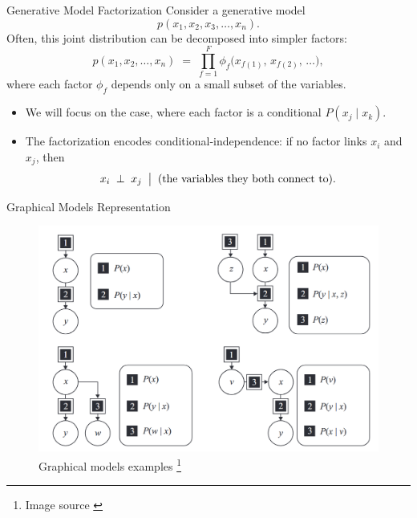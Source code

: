 \documentclass[aspectratio=1610, english]{beamer}
\begin{document}
\begin{frame}{Generative Model Factorization}
  Consider a generative model 
  \[
    p(x_1, x_2, x_3, \dots, x_n).
  \]
  Often, this joint distribution can be decomposed into simpler factors:
  \[
    p(x_1, x_2, \dots, x_n)
      \;=\;\prod_{f=1}^F \phi_f\bigl(x_{f(1)},\,x_{f(2)},\,\dots\bigr),
  \]
  where each factor \(\phi_f\) depends only on a small subset of the variables.  

  \medskip
  
  \begin{itemize}
    \item We will focus on the case, where each factor is a conditional \(P(x_j\!\mid x_k)\).  
    \item  The factorization encodes conditional‐independence: if no factor links \(x_i\) and \(x_j\), then 
      \[
        x_i \;\perp\; x_j 
        \;\bigm|\;
        \text{(the variables they both connect to)}.
      \]
  \end{itemize}
\end{frame}

\begin{frame}{Graphical Models Representation}
    \begin{figure}
        \centering
        \includegraphics[width=0.75\linewidth]{img/graphical_models.png}
        \caption{Graphical models examples \footnote{Image source \cite{active-inference-book}}}
        \label{fig:graphical-model-example}
    \end{figure}
\end{frame}
\end{document}
